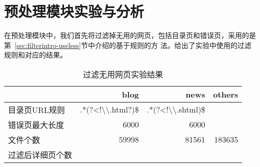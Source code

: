 \section{预处理模块实验与分析}
\label{sec:experiement:pre}
在预处理模块中，我们首先将过滤掉无用的网页，包括目录页和错误页，采用的是
第~\ref{sec:filterintro-useless}节中介绍的基于规则的方
法。给出了实验中使用的过滤规则和对应的结果。%
\begin{table}[hb]
  \centering
\begin{tabular}{lrrr}
  \toprule
 & blog & news & others \\
\hline
目录页URL规则 & .*(?<!\textbackslash\textbackslash.html?)\$ & .*(?<!\textbackslash\textbackslash.shtml)\$ &  \\
错误页最大长度 & 6000 & 6000 &  \\
文件个数 & 59998 & 81561 & 183635 \\
过滤后详细页个数 &  &  &  \\
\bottomrule
\end{tabular}
  \caption{过滤无用网页实验结果}
  \label{experiment:tab:filter}
\end{table}
\begin{comment}
#+ORGTBL: SEND 过滤无用网页 orgtbl-to-latex :splice nil :skip 0
|                  |                                       blog |                                       news | others |
|------------------+--------------------------------------------+--------------------------------------------+--------|
| 目录页URL规则    | .*(?<!\textbackslash\textbackslash.html?)$ | .*(?<!\textbackslash\textbackslash.shtml)$ |        |
| 错误页最大长度   |                                       6000 |                                       6000 |        |
| 原来总文件个数   |                                      59998 |                                      81561 | 183635 |
| 过滤后详细页个数 |                                            |                                            |        |
\end{comment}

